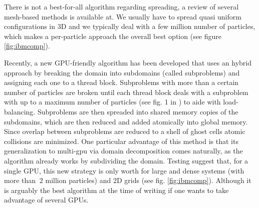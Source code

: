 \documentclass[ twoside,openright,titlepage,numbers=noenddot,%
headinclude,footinclude,cleardoublepage=empty,abstract=on,
BCOR=5mm,paper=a4,fontsize=11pt, dvipsnames
]{scrreprt}
\newcommand{\gpu}{\gls{GPU}\xspace}
\begin{document}
There is not a best-for-all algorithm regarding spreading, a review of several mesh-based methods is available at\cite{Guo2015}.
We usually have to spread quasi uniform configurations in 3D and we typically deal with a few million number of particles, which makes a per-particle approach the overall best option (see figure \ref{fig:ibmcomp}).

Recently, a new \gpu-friendly algorithm has been developed\cite{Shih2021} that uses an hybrid approach by breaking the domain into subdomains (called subproblems) and assigning each one to a thread block. Subproblems with more than a certain number of particles are broken until each thread block deals with a subproblem with up to a maximum number of particles (see fig. 1 in \cite{Shih2021}) to aide with load-balancing. Subproblems are then spreaded into shared memory copies of the subdomains, which are then reduced and added atomically into global memory. Since overlap between subproblems are reduced to a shell of ghost cells atomic collisions are minimized. One particular advantage of this method is that its generalization to multi-gpu via domain decomposition comes naturally, as the algorithm already works by subdividing the domain. Testing suggest that, for a single \gpu, this new strategy is only worth for large and dense systems (with more than $~2$ million particles) and 2D grids (see fig. \ref{fig:ibmcomp}). Although it is arguably the best algorithm at the time of writing if one wants to take advantage of several GPUs.
\end{document}
